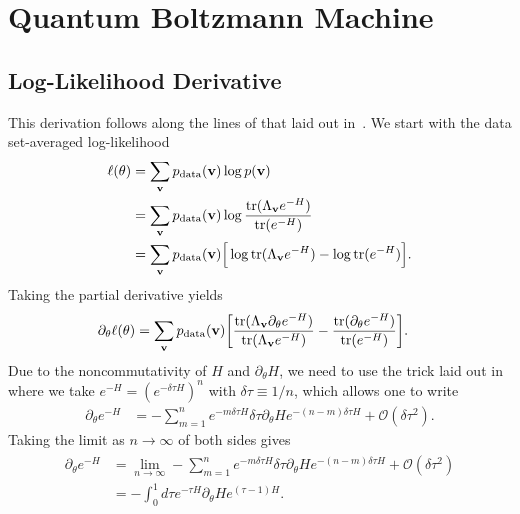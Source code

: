 \chapter{Quantum Boltzmann Machine}
\section{Log-Likelihood Derivative}\label{app:qbm_log_likelihood_derivation}
This derivation follows along the lines of that laid out in~\cite{amin_2018}.
We start with the data set-averaged log-likelihood
\begin{align}
\begin{split}
    \ell(\theta)
        &= \sum_{\mathbf{v}} p_{\text{data}}(\mathbf{v}) \log p(\mathbf{v}) \\
        &= \sum_{\mathbf{v}} p_{\text{data}}(\mathbf{v}) \log \frac{\text{tr}(\Lambda_{\mathbf{v}} e^{-H})}{\text{tr}(e^{-H})} \\
        &= \sum_{\mathbf{v}} p_{\text{data}}(\mathbf{v}) \Big[ \log\text{tr}(\Lambda_{\mathbf{v}} e^{-H}) - \log\text{tr}(e^{-H}) \Big].
\end{split}
\end{align}
Taking the partial derivative yields
\begin{align}
    \label{eq:qbm_log_likelihood_derivative}
    \partial_\theta \ell(\theta)
        &= \sum_{\mathbf{v}} p_{\text{data}}(\mathbf{v}) \bigg[ \frac{\text{tr}(\Lambda_{\mathbf{v}} \partial_\theta e^{-H})}{\text{tr}(\Lambda_{\mathbf{v}} e^{-H})} - \frac{\text{tr}(\partial_\theta e^{-H})}{\text{tr}(e^{-H})} \bigg].
\end{align}
Due to the noncommutativity of \( H \) and \( \partial_\theta H \), we need to use the trick laid out in~\cite{amin_2018} where we take \( e^{-H} = (e^{-\delta\tau H})^n \) with \( \delta\tau \equiv 1 / n \), which allows one to write
\begin{align}
    \partial_\theta e^{-H}
        &= -\sum_{m=1}^{n} e^{-m\delta\tau H} \delta\tau \partial_\theta He^{-(n-m)\delta\tau H} + \mathcal{O}(\delta\tau^2).
\end{align}
Taking the limit as \( n \rightarrow \infty \) of both sides gives
\begin{align}
\begin{split}
    \partial_\theta e^{-H}
        &= \lim_{n\rightarrow\infty} -\sum_{m=1}^{n} e^{-m\delta\tau H} \delta\tau \partial_\theta He^{-(n-m)\delta\tau H} + \mathcal{O}(\delta\tau^2) \\
        &= -\int_{0}^{1} d\tau e^{-\tau H} \partial_\theta H e^{(\tau-1)H}.
\end{split}
\end{align}
